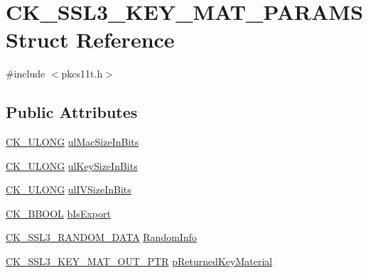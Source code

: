 \hypertarget{struct_c_k___s_s_l3___k_e_y___m_a_t___p_a_r_a_m_s}{}\section{C\+K\+\_\+\+S\+S\+L3\+\_\+\+K\+E\+Y\+\_\+\+M\+A\+T\+\_\+\+P\+A\+R\+A\+MS Struct Reference}
\label{struct_c_k___s_s_l3___k_e_y___m_a_t___p_a_r_a_m_s}


{\ttfamily \#include $<$pkcs11t.\+h$>$}

\subsection*{Public Attributes}
\begin{DoxyCompactItemize}
\item 
\hyperlink{pkcs11t_8h_a35181858a3b7a0a81f49d180d8f446ef}{C\+K\+\_\+\+U\+L\+O\+NG} \hyperlink{struct_c_k___s_s_l3___k_e_y___m_a_t___p_a_r_a_m_s_a02e30c07929506f8a878a24349d99066}{ul\+Mac\+Size\+In\+Bits}
\item 
\hyperlink{pkcs11t_8h_a35181858a3b7a0a81f49d180d8f446ef}{C\+K\+\_\+\+U\+L\+O\+NG} \hyperlink{struct_c_k___s_s_l3___k_e_y___m_a_t___p_a_r_a_m_s_ad2e5b76a9c770b3e55c931ea0bf0cf6a}{ul\+Key\+Size\+In\+Bits}
\item 
\hyperlink{pkcs11t_8h_a35181858a3b7a0a81f49d180d8f446ef}{C\+K\+\_\+\+U\+L\+O\+NG} \hyperlink{struct_c_k___s_s_l3___k_e_y___m_a_t___p_a_r_a_m_s_a273e058984b05fe492b6d61aa9c663f9}{ul\+I\+V\+Size\+In\+Bits}
\item 
\hyperlink{pkcs11t_8h_abd07a1bba363f8083080b9328e67b491}{C\+K\+\_\+\+B\+B\+O\+OL} \hyperlink{struct_c_k___s_s_l3___k_e_y___m_a_t___p_a_r_a_m_s_ae3d9c8286def8fa37af7a192a7cb0c72}{b\+Is\+Export}
\item 
\hyperlink{struct_c_k___s_s_l3___r_a_n_d_o_m___d_a_t_a}{C\+K\+\_\+\+S\+S\+L3\+\_\+\+R\+A\+N\+D\+O\+M\+\_\+\+D\+A\+TA} \hyperlink{struct_c_k___s_s_l3___k_e_y___m_a_t___p_a_r_a_m_s_a7387cc6814e33f415c8d8911c180e1b3}{Random\+Info}
\item 
\hyperlink{pkcs11t_8h_adb0cccb89d4cb7ff741ec4e1b1b868e3}{C\+K\+\_\+\+S\+S\+L3\+\_\+\+K\+E\+Y\+\_\+\+M\+A\+T\+\_\+\+O\+U\+T\+\_\+\+P\+TR} \hyperlink{struct_c_k___s_s_l3___k_e_y___m_a_t___p_a_r_a_m_s_ae594680757bfb006a92c466af54ae88a}{p\+Returned\+Key\+Material}
\end{DoxyCompactItemize}


